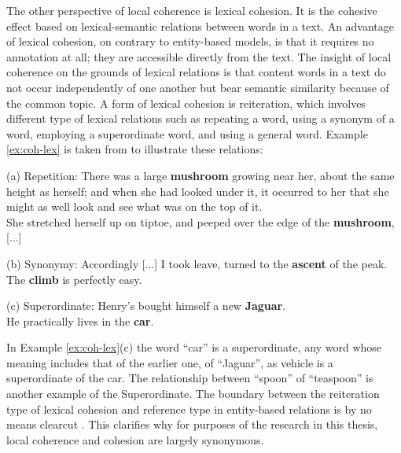 The other perspective of local coherence is lexical cohesion. 
It is the cohesive effect based on lexical-semantic relations between words in a text. 
An advantage of lexical cohesion, on contrary to entity-based models, is that it requires no annotation at all; they are accessible directly from the text. 
The insight of local coherence on the grounds of lexical relations is that content words in a text do not occur independently of one another but bear semantic similarity because of the common topic. 
A form of lexical cohesion is reiteration, which involves different type of lexical relations such as repeating a word, using a synonym of a word, employing a superordinate word, and using a general word. 
Example \ref{ex:coh-lex} is taken from  to illustrate these relations:

\begin{examples}
	\label{ex:coh-lex}
	(a) Repetition: There was a large \textbf{mushroom} growing near her, about the same height as herself; and when she had looked under it, it occurred to her that she might as well look and see what was on the top of it.\\
	She stretched herself up on tiptoe, and peeped over the edge of the \textbf{mushroom}, [...] 

	(b) Synonymy: Accordingly [...] I took leave, turned to the \textbf{ascent} of the peak. \\
	The \textbf{climb} is perfectly easy. 

	(c) Superordinate: Henry's bought himself a new \textbf{Jaguar}. \\
	He practically lives in the \textbf{car}. 

\end{examples} 

In Example \ref{ex:coh-lex}(c) the word ``car'' is a superordinate, any word whose meaning includes that of the earlier one, of ``Jaguar'', as vehicle is a superordinate of the car. 
The relationship between ``spoon'' of ``teaspoon'' is another example of the Superordinate. 
The boundary between the reiteration type of lexical cohesion and reference type in entity-based relations is by no means clearcut
\cite{halliday76}. 
This clarifies why for purposes of the research in this thesis, local coherence and cohesion are largely synonymous.

